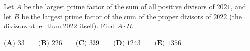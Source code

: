 Let $A$ be the largest prime factor of the sum of all positive divisors of $2021$, and let $B$ be the largest prime factor of the sum of the proper divisors of $2022$ (the divisors other than $2022$ itself). Find $A\cdot B$.

$\textbf{(A) } 33 \qquad \textbf{(B) } 226 \qquad \textbf{(C) } 339 \qquad \textbf{(D) } 1243 \qquad \textbf{(E) } 1356$
